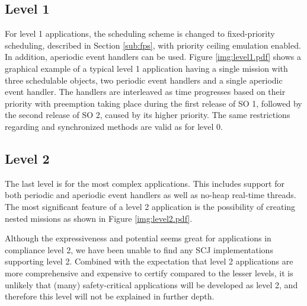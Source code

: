 \subsection{Level 1}
For level 1 applications, the scheduling scheme is changed to fixed-priority scheduling, described in Section \ref{sub:fps}, with priority ceiling emulation enabled. In addition, aperiodic event handlers can be used. Figure \ref{img:level1.pdf} shows a graphical example of a typical level 1 application having a single mission with three schedulable objects, two periodic event handlers and a single aperiodic event handler. The handlers are interleaved as time progresses based on their priority with preemption taking place during the first release of SO 1, followed by the second release of SO 2, caused by its higher priority. The same restrictions regarding  and synchronized methods are valid as for level 0.


\subsection{Level 2}
The last level is for the most complex applications. This includes support for both periodic and aperiodic event handlers as well as no-heap real-time threads. The most significant feature of a level 2 application is the possibility of creating nested missions as shown in Figure \ref{img:level2.pdf}.


Although the expressiveness and potential seems great for applications in compliance level 2, we have been unable to find any SCJ implementations supporting level 2. Combined with the expectation that level 2 applications are more comprehensive and expensive to certify compared to the lesser levels, it is unlikely that (many) safety-critical applications will be developed as level 2, and therefore this level will not be explained in further depth.
